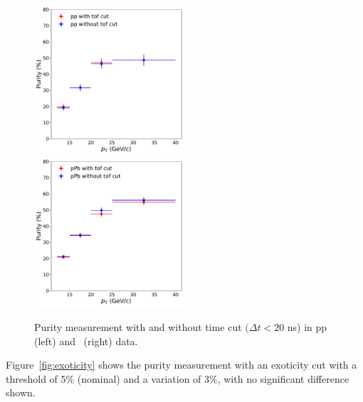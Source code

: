 \begin{figure}
	\center
	\includegraphics[width=0.495\textwidth]{Checks_Systematics/pptof.pdf}
	\includegraphics[width=0.495\textwidth]{Checks_Systematics/ppbtof.pdf}
	\caption{Purity measurement with and without time cut $(\Delta t<20$ ns) in pp (left) and \pPb~(right) data.}
	\label{fig:TOF}
\end{figure}

Figure~\ref{fig:exoticity} shows the purity measurement with an exoticity cut with a threshold of 5\% (nominal) and a variation of $3\%$, with no significant difference shown. 


